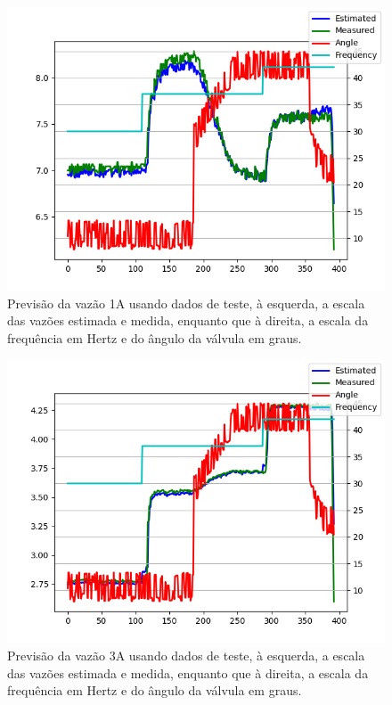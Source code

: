 \documentclass[12pt]{article}
\begin{document}
\begin{figure}
    \centering
    \includegraphics{results/complete-test-1A.png}
    \caption{Previsão da vazão 1A usando dados de teste, à esquerda, a escala das vazões estimada e medida, enquanto que à direita, a escala da frequência em Hertz e do ângulo da válvula em graus.}
    \label{fig:complete-test-1A}
\end{figure}

\begin{figure}
    \centering
    \includegraphics{results/complete-test-3A.png}
    \caption{Previsão da vazão 3A usando dados de teste, à esquerda, a escala das vazões estimada e medida, enquanto que à direita, a escala da frequência em Hertz e do ângulo da válvula em graus.}
    \label{fig:complete-test-3A}
\end{figure}
\end{document}
